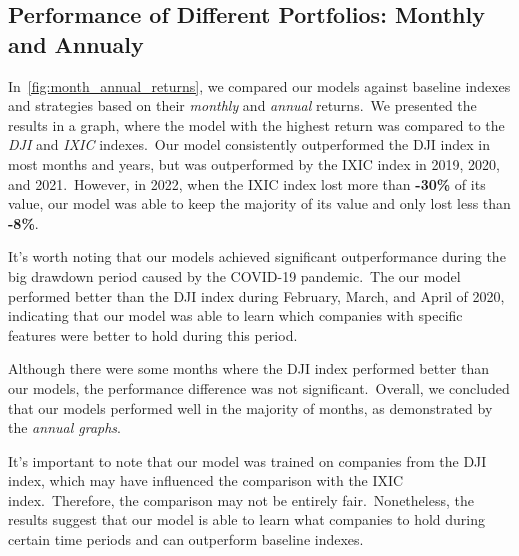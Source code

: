 \documentclass[../xlapes02]{subfiles}
\begin{document}
    \subsection{Performance of Different Portfolios: Monthly and Annualy}\label{subsec:monthly-and-annual-returns}
    In~\cref{fig:month_annual_returns}, we compared our models against baseline indexes and strategies based on their \emph{monthly} and \emph{annual} returns.\ We presented the results in a graph, where the model with the highest return was compared to the \emph{DJI} and \emph{IXIC} indexes.\ Our model consistently outperformed the DJI index in most months and years, but was outperformed by the IXIC index in 2019, 2020, and 2021.\ However, in 2022, when the IXIC index lost more than \textbf{-30\%} of its value, our model was able to keep the majority of its value and only lost less than \textbf{-8\%}.

    It's worth noting that our models achieved significant outperformance during the big drawdown period caused by the COVID-19 pandemic.\ The our model performed better than the DJI index during February, March, and April of 2020, indicating that our model was able to learn which companies with specific features were better to hold during this period.

    Although there were some months where the DJI index performed better than our models, the performance difference was not significant.\ Overall, we concluded that our models performed well in the majority of months, as demonstrated by the \emph{annual graphs}.

    It's important to note that our model was trained on companies from the DJI index, which may have influenced the comparison with the IXIC index.\ Therefore, the comparison may not be entirely fair.\ Nonetheless, the results suggest that our model is able to learn what companies to hold during certain time periods and can outperform baseline indexes.
\end{document}
